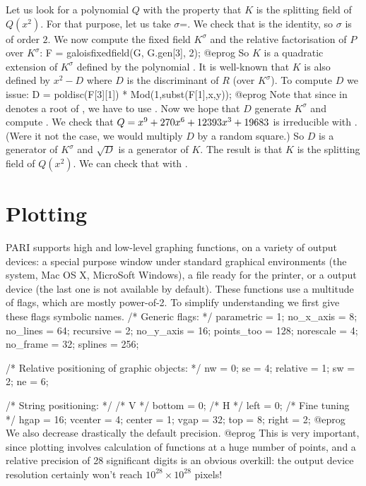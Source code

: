 Let us look for a polynomial $Q$ with the property that $K$ is the splitting
field of $Q(x^2)$. For that purpose, let us take $\sigma$=.  We
check that  is the identity, so $\sigma$ is of order $2$. We now compute the fixed field $K^\sigma$ and the relative factorisation of $P$ over
$K^\sigma$: 
\bprog 
F = galoisfixedfield(G, G.gen[3], 2); 
@eprog\noindent
So $K$ is a quadratic extension of $K^\sigma$ defined by the polynomial
. It is well-known that $K$ is also defined by $x^2-D$
where $D$ is the discriminant of $R$ (over $K^\sigma$).
To compute $D$ we issue:
\bprog
D = poldisc(F[3][1]) * Mod(1,subst(F[1],x,y));
@eprog\noindent
Note that since  in  denotes a root of , we 
have to use .  Now we hope that $D$ generate $K^\sigma$ and
compute . We check that $Q=x^9+270\*x^6+12393\*x^3+19683$ is
irreducible with . (Were it not the case, we would
multiply $D$ by a random square.) So $D$ is a generator of $K^\sigma$ and
$\sqrt{D}$ is a generator of $K$. The result is that $K$ is the splitting
field of $Q(x^2)$.  We can check that with
.

\section{Plotting}

PARI supports high and low-level graphing functions, on a variety of output
devices: a special purpose window under standard graphical environments (the
 system, Mac OS X, MicroSoft Windows), a  file
ready for the printer, or a  output device (the last one
is not available by default). These functions use a multitude of flags, which
are mostly power-of-2. To simplify understanding we first give these flags
symbolic names.
\bprog
  /* Generic flags: */
  parametric = 1;  no_x_axis =  8;  no_lines   = 64;
  recursive  = 2;  no_y_axis = 16;  points_too = 128;
  norescale  = 4;  no_frame  = 32;  splines    = 256;

  /* Relative positioning of graphic objects: */
  nw       = 0;  se       = 4;  relative = 1;
  sw       = 2;  ne       = 6;

  /* String positioning: */
  /* V */ bottom  =  0;   /* H */  left   = 0;   /* Fine tuning */ hgap = 16;
          vcenter =  4;            center = 1;                     vgap = 32;
          top     =  8;            right  = 2;
@eprog\noindent
We also decrease drastically the default precision.
\bprog
@eprog\noindent
This is very important, since plotting involves calculation of functions at
a huge number of points, and a relative precision of 28 significant digits
is an obvious overkill: the output device resolution certainly won't reach
$10^{28} \times 10^{28}$ pixels!

